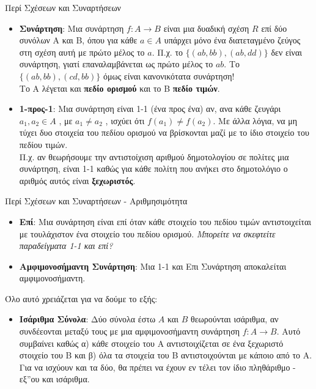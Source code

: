 \documentclass[size=14pt, paper=smartboard, style=fyma, mode=present]{powerdot}
\begin{document}
\begin{slide}[toc=]{Περί Σχέσεων και Συναρτήσεων}
	{\large
	\begin{itemize}
		\item \textbf{Συνάρτηση}: Μια συνάρτηση $f : A \to B$ είναι μια δυαδική σχέση $R$ επί δύο συνόλων Α και Β, όπου για κάθε $a \in A$ υπάρχει μόνο ένα διατεταγμένο ζεύγος στη σχέση αυτή με πρώτο μέλος το $a$. \pause
		Π.χ. το $\{(ab,bb),(ab,dd)\}$ δεν είναι συνάρτηση, γιατί επαναλαμβάνεται ως πρώτο μέλος το $ab$. Το $\{(ab,bb), (cd,bb)\}$ όμως είναι κανονικότατα συνάρτηση! \\
		Το Α λέγεται και \textbf{πεδίο ορισμού} και το Β \textbf{πεδίο τιμών}.
		\pause
		\item \textbf{1-προς-1}: Μια συνάρτηση είναι 1-1 (ένα προς ένα) αν, ανα κάθε ζευγάρι $a_1,a_2 \in A$ , με $a_1 \neq a_2$ , ισχύει ότι $f(a_1) \neq f(a_2)$. Με άλλα λόγια, να μη τύχει δυο στοιχεία του πεδίου ορισμού να βρίσκονται μαζί με το ίδιο στοιχείο του πεδίου τιμών.
		\\
		Π.χ. αν θεωρήσουμε την αντιστοίχιση αριθμού δημοτολογίου σε πολίτες μια συνάρτηση, είναι 1-1 καθώς για κάθε πολίτη που ανήκει στο δημοτολόγιο ο αριθμός αυτός είναι \textbf{ξεχωριστός}.
	\end{itemize}
	
}
\end{slide}
\begin{slide}[toc=]{Περί Σχέσεων και Συναρτήσεων - Αριθμησιμότητα}
{\large 	\begin{itemize}
				\item \textbf{Eπί}: Μια συνάρτηση είναι επί όταν κάθε στοιχείο του πεδίου τιμών αντιστοιχείται με τουλάχιστον ένα στοιχείο του πεδίου ορισμού. \textit{Μπορείτε να σκεφτείτε παραδείγματα 1-1 και επί?} \pause
				\item \textbf{Αμφιμονοσήμαντη Συνάρτηση}: Μια 1-1 και Επι Συνάρτηση αποκαλείται αμφιμονοσήμαντη.
	\end{itemize}
Όλο αυτό χρειάζεται για να δούμε το εξής:
\begin{itemize} \pause
	\item \textbf{Ισάριθμα Σύνολα}: Δύο σύνολα έστω $Α$ και $Β$ θεωρούνται ισάριθμα, αν συνδέεονται μεταξύ τους με μια αμφιμονοσήμαντη συνάρτηση $f: A \to B$. Αυτό συμβαίνει καθώς α) κάθε στοιχείο του Α αντιστοιχίζεται σε ένα ξεχωριστό στοιχείο του Β και β) όλα τα στοιχεία του Β αντιστοιχούνται με κάποιο από το Α. Για να ισχύουν και τα δύο, θα πρέπει να έχουν εν τέλει τον ίδιο πληθάριθμο - εξ''ου και ισάριθμα.
\end{itemize}
}
\end{slide}
\end{document}
